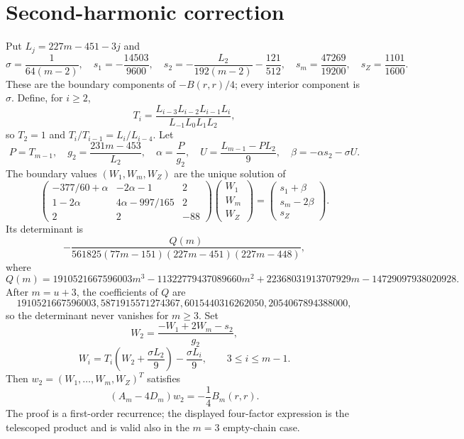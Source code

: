 \section*{Second-harmonic correction}
Put $L_j=227m-451-3j$ and
\[
\sigma=\frac1{64(m-2)},
\quad s_1=-\frac{14503}{9600},
\quad s_2=-\frac{L_2}{192(m-2)}-\frac{121}{512},
\quad s_m=\frac{47269}{19200},
\quad s_Z=\frac{1101}{1600}.
\]
These are the boundary components of $-B(r,r)/4$; every interior component is
$\sigma$.  Define, for $i\ge2$,
\[
T_i=\frac{L_{i-3}L_{i-2}L_{i-1}L_i}{L_{-1}L_0L_1L_2},
\]
so $T_2=1$ and $T_i/T_{i-1}=L_i/L_{i-4}$.  Let
\[
P=T_{m-1},
\quad g_2=\frac{231m-453}{L_2},
\quad \alpha=\frac{P}{g_2},
\quad U=\frac{L_{m-1}-PL_2}{9},
\quad \beta=-\alpha s_2-\sigma U.
\]
The boundary values $(W_1,W_m,W_Z)$ are the unique solution of
\[
\begin{pmatrix}
-377/60+\alpha&-2\alpha-1&2\\
1-2\alpha&4\alpha-997/165&2\\
2&2&-88
\end{pmatrix}
\begin{pmatrix}W_1\\W_m\\W_Z\end{pmatrix}
=
\begin{pmatrix}s_1+\beta\\s_m-2\beta\\s_Z\end{pmatrix}.
\]
Its determinant is
\[
-\frac{Q(m)}{561825(77m-151)(227m-451)(227m-448)},
\]
where
\[
Q(m)=1910521667596003m^3-11322779437089660m^2
+22368031913707929m-14729097938020928.
\]
After $m=u+3$, the coefficients of $Q$ are
\[
1910521667596003,
5871915571274367,
6015440316262050,
2054067894388000,
\]
so the determinant never vanishes for $m\ge3$.  Set
\[
W_2=\frac{-W_1+2W_m-s_2}{g_2},
\]
\[
W_i=T_i\left(W_2+\frac{\sigma L_2}{9}\right)
 -\frac{\sigma L_i}{9},
\qquad3\le i\le m-1.
\]
Then $w_2=(W_1,\ldots,W_m,W_Z)^T$ satisfies
\[
(A_m-4D_m)w_2=-\frac14B_m(r,r).
\]
The proof is a first-order recurrence; the displayed four-factor expression is
the telescoped product and is valid also in the $m=3$ empty-chain case.
